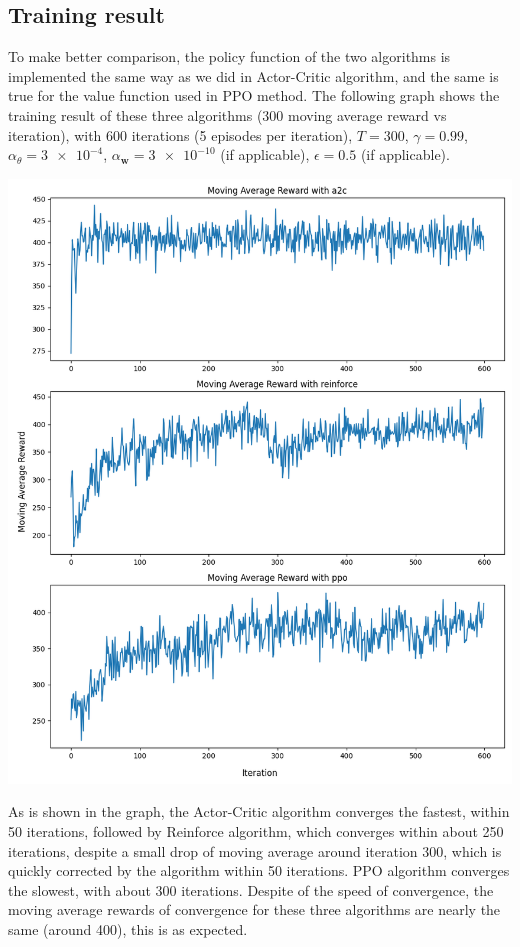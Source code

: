 \documentclass[11pt]{article}
\begin{document}
\subsection{Training result}
To make better comparison, the policy function of the two algorithms
is implemented the same way as we did in Actor-Critic algorithm, and the same 
is true for the value function used in PPO method. 
\vspace{3mm}\newline The following graph shows the training result of these 
three algorithms (300 moving average reward vs iteration), with 600 iterations
(5 episodes per iteration), \(T=300\), \(\gamma=0.99\), 
\(\alpha_\theta=\num{3e-4}\), \(\alpha_{\bm{w}}=\num{3e-10}\) (if applicable),
\(\epsilon=0.5\) (if applicable).
\begin{center}
    \includegraphics[scale=0.67]{out}
\end{center}
As is shown in the graph, the Actor-Critic algorithm converges the fastest,
within 50 iterations, followed by Reinforce algorithm, which converges within
about 250 iterations, despite a small drop of moving average around iteration 
300, which is quickly corrected by the algorithm within 50 iterations. PPO 
algorithm converges the slowest, with about 300 iterations. Despite of the 
speed of convergence, the moving average rewards of convergence for these 
three algorithms are nearly the same (around 400), this is as expected.
\end{document}
